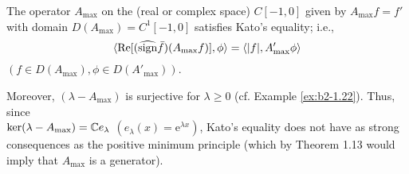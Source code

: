 \begin{example}\label{ex:b2-2.12}
The operator $A_{\max}$ on the (real or complex space) $C[-1,0]$ given by $A_{\max}f = f'$ with domain $D(A_{\max}) = C^{1}[-1,0]$ satisfies Kato's equality; i.e.,
\begin{equation}\label{eq:b2-2.16}
\langle \mathop{}\!\mathrm{Re}[(\widehat{\operatorname{sign}} \bar{f})(A_{\max}f)],\phi \rangle = \langle |f|,A'_{\max}\phi \rangle
\end{equation}
$(f \in D(A_{\max}), \phi \in D(A'_{\max}))$.

Moreover, $(\lambda - A_{\max})$ is surjective for $\lambda \geq 0$ (cf. Example  \ref{ex:b2-1.22}).
Thus, since \\
$\ker(\lambda - A_{\max}) = \mathbb{C} e_{\lambda}$ $(e_{\lambda}(x) = \mathrm{e}^{\lambda x})$, Kato's equality does not have as strong consequences as the positive minimum principle (which by Theorem 1.13 would imply that $A_{\max}$ is a generator).
\end{example}

